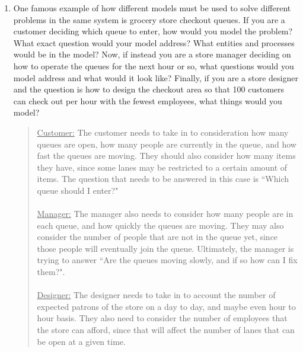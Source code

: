\documentclass{hw}
\begin{document}
\makeheader{}

\begin{enumerate}
\item One famous example of how different models must be used to solve different problems in the same
system is grocery store checkout queues. If you are a customer deciding which queue to enter, how would
you model the problem? What exact question would your model address? What entities and processes would
be in the model? Now, if instead you are a store manager deciding on how to operate the queues for the
next hour or so, what questions would you model address and what would it look like? Finally, if you
are a store designer and the question is how to design the checkout area so that 100 customers can
check out per hour with the fewest employees, what things would you model?
\begin{quote}
\underline{Customer:} The customer needs to take in to consideration how many queues are open,
how many people are currently in the queue, and how fast the queues are moving. They should also consider
how many items they have, since some lanes may be restricted to a certain amount of items. The question
that needs to be answered in this case is ``Which queue should I enter?"\\\\
\underline{Manager:} The manager also needs to consider how many people are in each queue, and how
quickly the queues are moving. They may also consider the number of people that are not in the queue
yet, since those people will eventually join the queue. Ultimately, the manager is trying to answer
``Are the queues moving slowly, and if so how can I fix them?".\\\\
\underline{Designer:} The designer needs to take in to account the number of expected patrons of the store
on a day to day, and maybe even hour to hour basis. They also need to consider the number of employees
that the store can afford, since that will affect the number of lanes that can be open at a given time.
\end{quote}


\end{enumerate}
\end{document}
